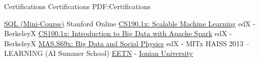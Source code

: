 
\Section
{Certifications}
{Certifications}
{PDF:Certifications}

\Entry
\BulletItem
\href{https://prod-cert-bucket.s3.amazonaws.com/downloads/fbf5d79cf19c44558bc4d29472f0cfa0/Statement.pdf}{SQL (Mini-Course)}
\hfill Stanford Online
\BulletItem
\href{https://s3.amazonaws.com/verify.edx.org/downloads/1a3787ec554649b3be0738d8f9c4f7cd/Certificate.pdf}{CS190.1x: Scalable Machine Learning}
\hfill edX - BerkeleyX
\BulletItem
\href{https://s3.amazonaws.com/verify.edx.org/downloads/ce3ef276c0d14f47b3a74bb1dc16b3ef/Certificate.pdf}{CS100.1x: Introduction to Big Data with Apache Spark}
\hfill edX - BerkeleyX
\BulletItem
\href{https://s3.amazonaws.com/verify.edx.org/downloads/22da36d4c36c4ffeac2c3bfb72481b2d/Certificate.pdf}{MAS.S69x: Big Data and Social Physics}
\hfill edX - MITx
\BulletItem
HAISS 2013 – LEARNING (AI Summer School)
\hfill 
\href{http://www.eetn.gr/}{EETN} - 
\href{http://www.ionio.gr/}{Ionian University}